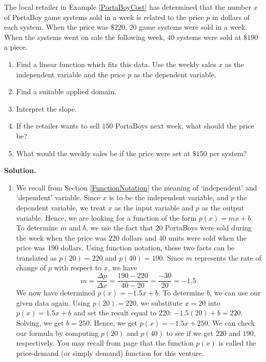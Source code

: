 \begin{ex} \label{PortaBoyDemand}  The local retailer in Example \ref{PortaBoyCost} has determined that the number $x$ of PortaBoy game systems sold in a week is related to the price $p$ in dollars of each system.  When the price was $\$220$, $20$ game systems were sold in a week.  When the systems went on sale the following week, $40$ systems were sold at $\$190$ a piece. 

\begin{enumerate}

\item Find a linear function which fits this data.  Use the weekly sales $x$ as the independent variable and the price $p$ as the dependent variable.  

\item Find a suitable applied domain.

\item Interpret the slope.

\item  If the retailer wants to sell $150$ PortaBoys next week, what should the price be?

\item  What would the weekly sales be if the price were set at $\$150$ per system?

\end{enumerate}

\smallskip

{\bf Solution.}  

\begin{enumerate}

\item  We recall from Section \ref{FunctionNotation} the meaning of `independent' and `dependent' variable.  Since $x$ is to be the independent variable, and $p$ the dependent variable, we treat $x$ as the input variable and $p$ as the output variable.  Hence, we are looking for a function of the form $p(x) = mx + b$.  To determine $m$ and $b$, we use the fact that $20$ PortaBoys were sold during the week when the price was $220$ dollars and $40$ units were sold when the price was $190$ dollars.  Using function notation, these two facts can be translated as $p(20)=220$ and $p(40)=190$.  Since $m$ represents the rate of change of $p$ with respect to $x$, we have  \[ m = \dfrac{\Delta p}{\Delta x} = \dfrac{190-220}{40-20} = \dfrac{-30}{20} = -1.5.\]  We now have determined $p(x) = -1.5 x + b$.  To determine $b$, we can use our given data again.  Using $p(20) = 220$, we substitute $x=20$ into $p(x) = 1.5x + b$ and set the result equal to $220$:  $-1.5(20)+b = 220$.  Solving, we get  $b = 250$. Hence, we get $p(x) = -1.5x + 250$.  We can check our formula by computing $p(20)$ and $p(40)$ to see if we get $220$ and $190$, respectively.  You may recall from page \pageref{pricerevenuecostprofit} that the function $p(x)$ is called the price-demand (or simply demand) function for this venture.


\end{enumerate}
\end{ex}
